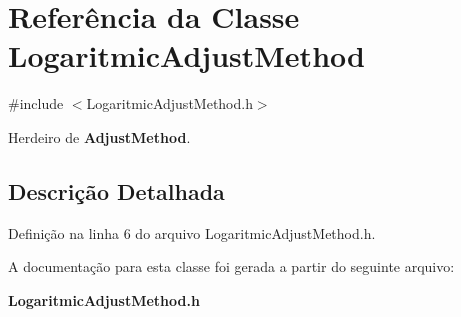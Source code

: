\section{Referência da Classe Logaritmic\+Adjust\+Method}
\label{class_logaritmic_adjust_method}


{\ttfamily \#include $<$Logaritmic\+Adjust\+Method.\+h$>$}



Herdeiro de {\bf Adjust\+Method}.



\subsection{Descrição Detalhada}


Definição na linha 6 do arquivo Logaritmic\+Adjust\+Method.\+h.



A documentação para esta classe foi gerada a partir do seguinte arquivo\+:\begin{DoxyCompactItemize}
\item 
{\bf Logaritmic\+Adjust\+Method.\+h}\end{DoxyCompactItemize}
